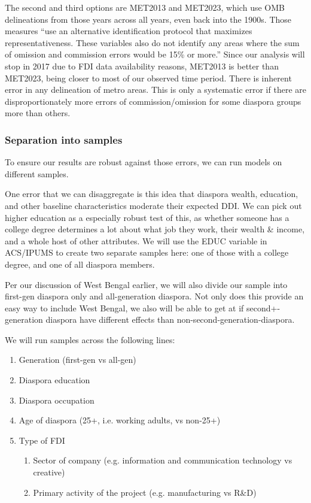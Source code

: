 \documentclass[12pt]{article}
\begin{document}
The second and third options are MET2013 and MET2023, which use OMB delineations from those years across all years, even back into the 1900s. Those measures ``use an alternative identification protocol that maximizes representativeness. These variables also do not identify any areas where the sum of omission and commission errors would be 15\% or more.'' Since our analysis will stop in 2017 due to FDI data availability reasons, MET2013 is better than MET2023, being closer to most of our observed time period. There is inherent error in any delineation of metro areas. This is only a systematic error if there are disproportionately more errors of commission/omission for some diaspora groups more than others.


    \subsubsection{Separation into samples} \label{ss:samples}
    To ensure our results are robust against those errors, we can run models on different samples. 
    
    One error that we can disaggregate is this idea that diaspora wealth, education, and other baseline characteristics moderate their expected DDI. We can pick out higher education as a especially robust test of this, as whether someone has a college degree determines a lot about what job they work, their wealth \& income, and a whole host of other attributes. We will use the EDUC variable in ACS/IPUMS to create two separate samples here: one of those with a college degree, and one of all diaspora members.
    
    Per our discussion of West Bengal earlier, we will also divide our sample into first-gen diaspora only and all-generation diaspora. Not only does this provide an easy way to include West Bengal, we also will be able to get at if second+-generation diaspora have different effects than non-second-generation-diaspora. 
    
    We will run samples across the following lines:
\begin{enumerate}
    \item Generation (first-gen vs all-gen)
    \item Diaspora education
    \item Diaspora occupation
    \item Age of diaspora (25+, i.e. working adults, vs non-25+)
    \item Type of FDI
    \begin{enumerate}
        \item Sector of company (e.g. information and communication technology vs creative)
        \item Primary activity of the project (e.g. manufacturing vs R\&D)
    \end{enumerate}
\end{enumerate}
\end{document}
